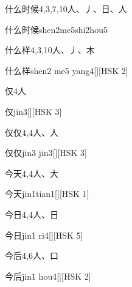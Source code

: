 \begin{entry}{什么时候}{4,3,7,10}{⼈、⼃、⽇、⼈}
  \begin{phonetics}{什么时候}{shen2me5shi2hou5}
  \end{phonetics}
\end{entry}

\begin{entry}{什么样}{4,3,10}{⼈、⼃、⽊}
  \begin{phonetics}{什么样}{shen2 me5 yang4}[][HSK 2]
  \end{phonetics}
\end{entry}

\begin{entry}{仅}{4}{⼈}
  \begin{phonetics}{仅}{jin3}[][HSK 3]
  \end{phonetics}
\end{entry}

\begin{entry}{仅仅}{4,4}{⼈、⼈}
  \begin{phonetics}{仅仅}{jin3 jin3}[][HSK 3]
  \end{phonetics}
\end{entry}

\begin{entry}{今天}{4,4}{⼈、⼤}
  \begin{phonetics}{今天}{jin1tian1}[][HSK 1]
  \end{phonetics}
\end{entry}

\begin{entry}{今日}{4,4}{⼈、⽇}
  \begin{phonetics}{今日}{jin1 ri4}[][HSK 5]
  \end{phonetics}
\end{entry}

\begin{entry}{今后}{4,6}{⼈、⼝}
  \begin{phonetics}{今后}{jin1 hou4}[][HSK 2]
  \end{phonetics}
\end{entry}

